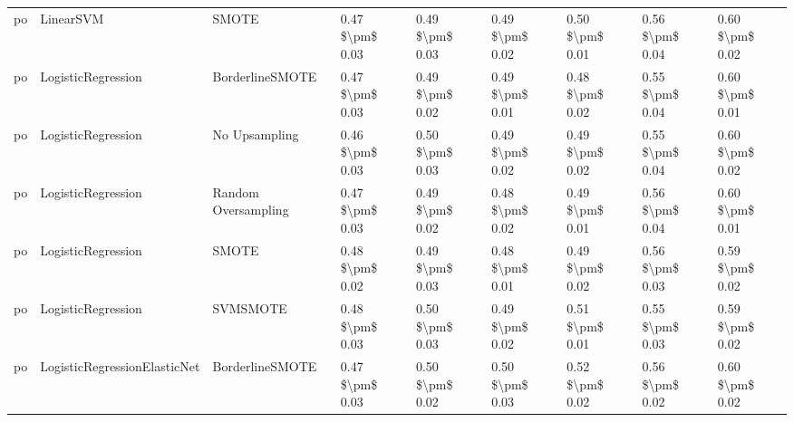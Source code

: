 \begin{tabular}{lllllllll}
      po &                       LinearSVM &                         SMOTE & 0.47 \$\textbackslash pm\$ 0.03 &           0.49 \$\textbackslash pm\$ 0.03 &       0.49 \$\textbackslash pm\$ 0.02 &        0.50 \$\textbackslash pm\$ 0.01 &                         0.56 \$\textbackslash pm\$ 0.04 &     0.60 \$\textbackslash pm\$ 0.02 \\
      po &              LogisticRegression &               BorderlineSMOTE & 0.47 \$\textbackslash pm\$ 0.03 &           0.49 \$\textbackslash pm\$ 0.02 &       0.49 \$\textbackslash pm\$ 0.01 &        0.48 \$\textbackslash pm\$ 0.02 &                         0.55 \$\textbackslash pm\$ 0.04 &     0.60 \$\textbackslash pm\$ 0.01 \\
      po &              LogisticRegression &                 No Upsampling & 0.46 \$\textbackslash pm\$ 0.03 &           0.50 \$\textbackslash pm\$ 0.03 &       0.49 \$\textbackslash pm\$ 0.02 &        0.49 \$\textbackslash pm\$ 0.02 &                         0.55 \$\textbackslash pm\$ 0.04 &     0.60 \$\textbackslash pm\$ 0.02 \\
      po &              LogisticRegression &           Random Oversampling & 0.47 \$\textbackslash pm\$ 0.03 &           0.49 \$\textbackslash pm\$ 0.02 &       0.48 \$\textbackslash pm\$ 0.02 &        0.49 \$\textbackslash pm\$ 0.01 &                         0.56 \$\textbackslash pm\$ 0.04 &     0.60 \$\textbackslash pm\$ 0.01 \\
      po &              LogisticRegression &                         SMOTE & 0.48 \$\textbackslash pm\$ 0.02 &           0.49 \$\textbackslash pm\$ 0.03 &       0.48 \$\textbackslash pm\$ 0.01 &        0.49 \$\textbackslash pm\$ 0.02 &                         0.56 \$\textbackslash pm\$ 0.03 &     0.59 \$\textbackslash pm\$ 0.02 \\
      po &              LogisticRegression &                      SVMSMOTE & 0.48 \$\textbackslash pm\$ 0.03 &           0.50 \$\textbackslash pm\$ 0.03 &       0.49 \$\textbackslash pm\$ 0.02 &        0.51 \$\textbackslash pm\$ 0.01 &                         0.55 \$\textbackslash pm\$ 0.03 &     0.59 \$\textbackslash pm\$ 0.02 \\
      po &    LogisticRegressionElasticNet &               BorderlineSMOTE & 0.47 \$\textbackslash pm\$ 0.03 &           0.50 \$\textbackslash pm\$ 0.02 &       0.50 \$\textbackslash pm\$ 0.03 &        0.52 \$\textbackslash pm\$ 0.02 &                         0.56 \$\textbackslash pm\$ 0.02 &     0.60 \$\textbackslash pm\$ 0.02 \\

\end{tabular}
